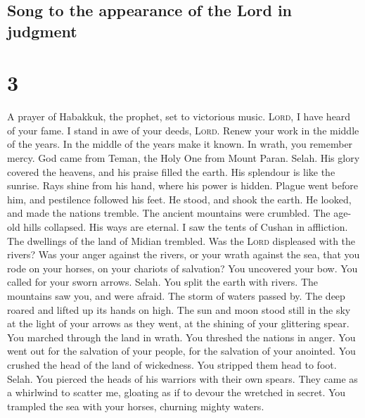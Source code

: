 \hypertarget{song-to-the-appearance-of-the-lord-in-judgment}{%
\subsection{Song to the appearance of the Lord in
judgment}\label{song-to-the-appearance-of-the-lord-in-judgment}}

\hypertarget{section-2}{%
\section{3}\label{section-2}}

 A prayer of Habakkuk, the prophet, set to victorious
music.  \textsc{Lord}, I have heard of your fame. I stand
in awe of your deeds, \textsc{Lord}. Renew your work in the middle of
the years. In the middle of the years make it known. In wrath, you
remember mercy.  God came from Teman, the Holy One from
Mount Paran. Selah. His glory covered the heavens, and his praise filled
the earth.  His splendour is like the sunrise. Rays shine
from his hand, where his power is hidden.  Plague went
before him, and pestilence followed his feet.  He stood,
and shook the earth. He looked, and made the nations tremble. The
ancient mountains were crumbled. The age-old hills collapsed. His ways
are eternal.  I saw the tents of Cushan in affliction. The
dwellings of the land of Midian trembled.  Was the
\textsc{Lord} displeased with the rivers? Was your anger against the
rivers, or your wrath against the sea, that you rode on your horses, on
your chariots of salvation?  You uncovered your bow. You
called for your sworn arrows. Selah. You split the earth with rivers.
 The mountains saw you, and were afraid. The storm of
waters passed by. The deep roared and lifted up its hands on high.
 The sun and moon stood still in the sky at the light of
your arrows as they went, at the shining of your glittering spear.
 You marched through the land in wrath. You threshed the
nations in anger.  You went out for the salvation of your
people, for the salvation of your anointed. You crushed the head of the
land of wickedness. You stripped them head to foot. Selah.
 You pierced the heads of his warriors with their own
spears. They came as a whirlwind to scatter me, gloating as if to devour
the wretched in secret.  You trampled the sea with your
horses, churning mighty waters.

